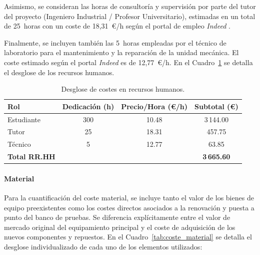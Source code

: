 \documentclass[11pt,fleqn]{book} %
\begin{document}
Asimismo, se consideran las horas de consultoría y supervisión por parte del tutor del proyecto (Ingeniero Industrial / Profesor Universitario), estimadas en un total de 25~horas con un coste de 18,31~\euro/h según el portal de empleo \textit{Indeed} \cite{sueldo_senior}. 

Finalmente, se incluyen también las 5~horas empleadas por el técnico de laboratorio para el mantenimiento y la reparación de la unidad mecánica. El coste estimado según el portal \textit{Indeed} \cite{sueldo_tecnico} es de 12,77~\euro/h. En el Cuadro~\ref{tab:coste_rrhh} se detalla el desglose de los recursos humanos.

\begin{table}[!htbp]
	\centering
	\caption{Desglose de costes en recursos humanos.}
	\label{tab:coste_rrhh}
	\begin{tabular}{lccc}
		\hline
		\textbf{Rol} & \textbf{Dedicación (h)} & \textbf{Precio/Hora (\euro/h)} & \textbf{Subtotal (\euro)} \\ \hline
		Estudiante & 300 & 10.48 & 3\,144.00 \\
		Tutor     & 25  & 18.31 & 457.75 \\ 
		Técnico   & 5   & 12.77 & 63.85 \\ \hline
		\textbf{Total RR.HH} & & & \textbf{3\,665.60} \\ \hline
	\end{tabular}
\end{table}

\paragraph{Material}
Para la cuantificación del coste material, se incluye tanto el valor de los bienes de equipo preexistentes como los costes directos asociados a la renovación y puesta a punto del banco de pruebas. Se diferencia explícitamente entre el valor de mercado original del equipamiento principal y el coste de adquisición de los nuevos componentes y repuestos. En el Cuadro~\ref{tab:coste_material} se detalla el desglose individualizado de cada uno de los elementos utilizados:
\end{document}

